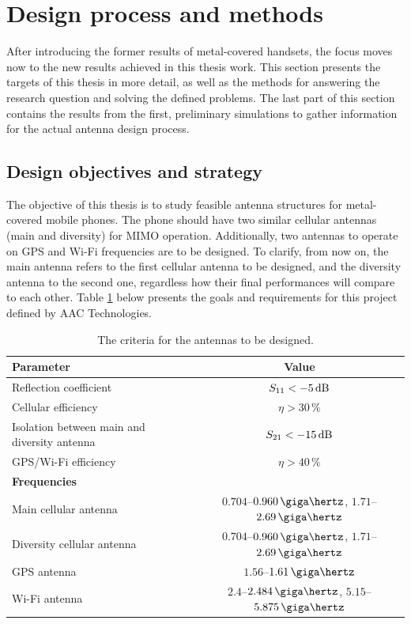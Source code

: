 \section{Design process and methods}
\label{sec:objectives}
After introducing the former results of metal-covered handsets, the focus moves now to the new results achieved in this thesis work. This section presents the targets of this thesis in more detail, as well as the methods for answering the research question and solving the defined problems. The last part of this section contains the results from the first, preliminary simulations to gather information for the actual antenna design process.

\subsection{Design objectives and strategy}
\label{sec:strategy}
The objective of this thesis is to study feasible antenna structures for metal-covered mobile phones. The phone should have two similar cellular antennas (main and diversity) for MIMO operation. Additionally, two antennas to operate on GPS and Wi-Fi frequencies are to be designed. To clarify, from now on, the main antenna refers to the first cellular antenna to be designed, and the diversity antenna to the second one, regardless how their final performances will compare to each other. Table \ref{tab:design_goals} below presents the goals and requirements for this project defined by AAC Technologies.

\begin{table}[H]
    \centering
    \caption{The criteria for the antennas to be designed.}
    \label{tab:design_goals}
    \begin{tabular}{|l|c|}
        \hline
         \textbf{Parameter} & \textbf{Value} \\
         \hline
         Reflection coefficient & $S_{11} < -5\,\mathrm{dB}$\\
         \hline
         Cellular efficiency & $\eta > 30\,\%$\\
         \hline
         Isolation between main and diversity antenna & $S_{21} < -15\,\mathrm{dB}$\\
         \hline
         GPS/Wi-Fi efficiency & $\eta > 40\,\%$\\
         \hline\hline
         \textbf{Frequencies} & \\
         \hline
         Main cellular antenna & $0.704$--$0.960\,\giga\hertz$, $1.71$--$2.69\,\giga\hertz$\\
         \hline
         Diversity cellular antenna & $0.704$--$0.960\,\giga\hertz$, $1.71$--$2.69\,\giga\hertz$\\
         \hline
         GPS antenna & $1.56$--$1.61\,\giga\hertz$\\
         \hline
         Wi-Fi antenna & $2.4$--$2.484\,\giga\hertz$, $5.15$--$5.875\,\giga\hertz$\\
         \hline
    \end{tabular}
\end{table}

